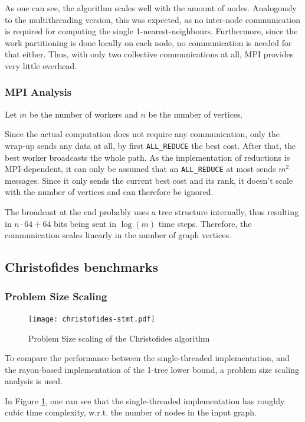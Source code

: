 As one can see, the algorithm scales well with the amount of nodes. Analogously to the multithreading version, this was expected, as no inter-node communication is required for computing the single 1-nearest-neighbours. Furthermore, since the work partitioning is done locally on each node, no communication is needed for that either. Thus, with only two collective communications at all, \ac{MPI} provides very little overhead.

\subsubsection{MPI Analysis}
Let $m$ be the number of workers and $n$ be the number of vertices.

Since the actual computation does not require any communication, only the wrap-up sends any data at all, by first \texttt{ALL\_REDUCE} the best cost. After that, the best worker broadcasts the whole path. As the implementation of reductions is \ac{MPI}-dependent, it can only be assumed that an \texttt{ALL\_REDUCE} at most sends $m^2$ messages. Since it only sends the current best cost and its rank, it doesn't scale with the number of vertices and can therefore be ignored.

The broadcast at the end probably uses a tree structure internally, thus resulting in $n\cdot64+64$ bits being sent in $\log(m)$ time steps. Therefore, the communication scales linearly in the number of graph vertices.

\subsection{Christofides benchmarks}
\label{sec:christofides_bench}

\subsubsection{Problem Size Scaling}

\begin{figure}[H]
  \centering
  \texttt{[image: christofides-stmt.pdf]}
  \caption{Problem Size scaling of the Christofides algorithm}
  \label{fig:weak_scaling_christofides}
\end{figure}
To compare the performance between the single-threaded implementation,
and the rayon-based implementation of the 1-tree lower bound,
a problem size scaling analysis is used.

In Figure \ref{fig:weak_scaling_christofides}, one can see that
the single-threaded implementation has roughly cubic
time complexity, w.r.t. the number of nodes in the input graph.

